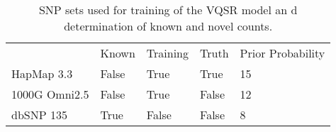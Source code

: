 \begin{table}[h]
\centering
\begin{tabular}{lllll}
              & Known & Training & Truth & Prior Probability \\
HapMap 3.3    & False & True     & True  & 15                \\
1000G Omni2.5 & False & True     & False & 12                \\
dbSNP 135     & True  & False    & False & 8                
\end{tabular}
\caption{SNP sets used for training of the \gls{VQSR} model an d determination of known and novel counts.}
\label{tab:vr_sets}
\end{table}